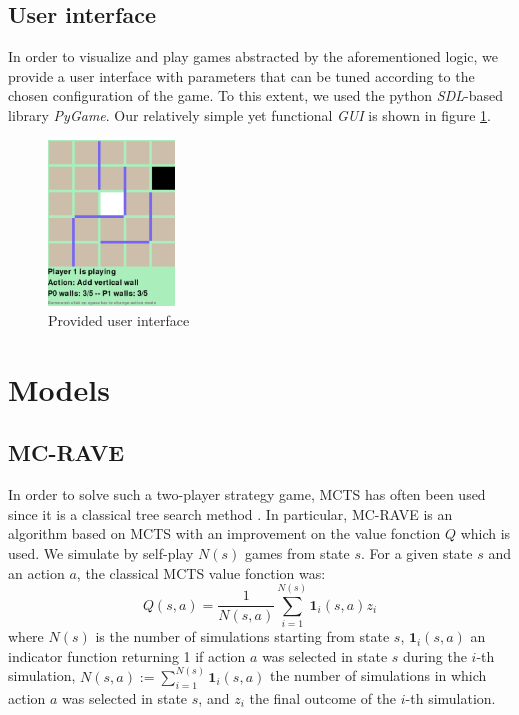 \documentclass[journal, a4paper]{IEEEtran}
\begin{document}
\subsection{User interface}
In order to visualize and play games abstracted by the aforementioned logic, we provide a user interface with parameters that can be tuned according to the chosen configuration of the game. To this extent, we used the python \textit{SDL}-based library \textit{PyGame}\cite{pygame}. Our relatively simple yet functional \textit{GUI} is shown in figure \ref{fig:gui}.
\begin{figure}
    \centering
    \includegraphics[width=0.3\textwidth]{figures/gui.png}
    \caption{Provided user interface}
    \label{fig:gui}
\end{figure}


\section{Models}
\label{sec:models}

\subsection{MC-RAVE}
In order to solve such a two-player strategy game, MCTS has often been used since it is a classical tree search method \cite{mcts-review}. In particular, MC-RAVE \cite{mc-rave} is an algorithm based on MCTS with an improvement on the value fonction $Q$ which is used. We simulate by self-play $N(s)$ games from state $s$. For a given state $s$ and an action $a$, the classical MCTS value fonction was:
$$Q(s,a) = \frac{1}{N(s,a)} \sum_{i=1}^{N(s)} \mathbf{1}_{i}(s,a)z_i$$
where $N(s)$ is the number of simulations starting from state $s$, $\mathbf{1}_{i}(s,a)$ an indicator function returning 1 if action $a$ was selected in state $s$ during the $i$-th simulation, $N(s,a):=\sum_{i=1}^{N(s)} \mathbf{1}_{i}(s,a)$ the number of simulations in which action $a$ was selected in state $s$, and $z_i$ the final outcome of the $i$-th simulation.
\end{document}
